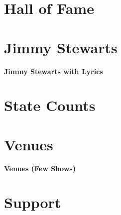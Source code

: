 \documentclass[8pt]{book}
\makeatletter
\let\mcnewpage=\newpage
\newcommand{\TrickSupertabularIntoMulticols}{
  \renewcommand\newpage{
    \if@firstcolumn
      \hrule width\linewidth height0pt
      \columnbreak
    \else
      \mcnewpage
    \fi
  }
}
\makeatother
\begin{document}
\chapter{Hall of Fame}

\begin{multicols*}{3}
\TrickSupertabularIntoMulticols

\end{multicols*}


\chapter{Jimmy Stewarts}

\begin{multicols*}{3}
\TrickSupertabularIntoMulticols

\begin{center}\Large{\textbf{Jimmy Stewarts with Lyrics}}\end{center}

\end{multicols*}


\chapter{State Counts}

\setlength{\tabcolsep}{5pt}
\begin{multicols*}{2}
\TrickSupertabularIntoMulticols

\end{multicols*}


\chapter{Venues}

\begin{multicols*}{3}
\TrickSupertabularIntoMulticols
\noindent

\end{multicols*}
\newpage
\begin{Large}\noindent\textbf{Venues (Few Shows)}\end{Large}



\chapter{Support}
\end{document}

